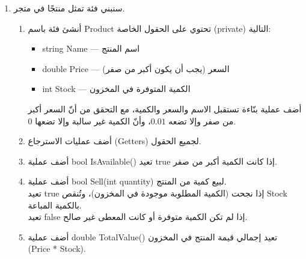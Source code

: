 \documentclass[14pt]{extarticle}
\begin{document}
\begin{enumerate}[itemsep=2em]
{\begin{boxSolution}
\begin{english}
\begin{verbatim}
    acc.Deposit(200);
    acc.Print();

    bool ok1 = acc.Withdraw(800);
    Console.WriteLine("Withdraw 800: " + ok1);
    acc.Print();

    bool ok2 = acc.Withdraw(300);
    Console.WriteLine("Withdraw 300: " + ok2);
    acc.Print();
}
\end{verbatim}
\end{english}
\end{boxSolution}
}
\fi
\clearpage

\item
سنبني فئة تمثل منتجًا في متجر.
\begin{enumerate}[itemsep=1em]
    \item أنشئ فئة باسم \textenglish{Product} تحتوي على الحقول الخاصة (\textenglish{private}) التالية:
    \begin{itemize}[itemsep=1pt]
        \item \textenglish{string Name} — اسم المنتج
        \item \textenglish{double Price} — السعر (يجب أن يكون أكبر من صفر)
        \item \textenglish{int Stock} — الكمية المتوفرة في المخزون
    \end{itemize}
    أضف عملية بنّاءة تستقبل الاسم والسعر والكمية، مع التحقق من أنّ السعر أكبر من صفر وإلا تضعه $0.01$، وأنّ الكمية غير سالبة وإلا تضعها 0.

    \item أضف عمليات الاسترجاع (Getters) لجميع الحقول.

    \item أضف عملية \textenglish{bool IsAvailable()} تعيد \textenglish{true} إذا كانت الكمية أكبر من صفر.

    \item أضف عملية \textenglish{bool Sell(int quantity)} لبيع كمية من المنتج.\\
    تعيد \textenglish{true} إذا نجحت (الكمية المطلوبة موجودة في المخزون)، وتُنقص \textenglish{Stock} بالكمية المباعة.\\
    تعيد \textenglish{false} إذا لم تكن الكمية متوفرة أو كانت المعطى غير صالح.

    \item أضف عملية \textenglish{double TotalValue()} تعيد إجمالي قيمة المنتج في المخزون \\ (\textenglish{Price * Stock}).


\end{enumerate}
\end{enumerate}
\end{document}
